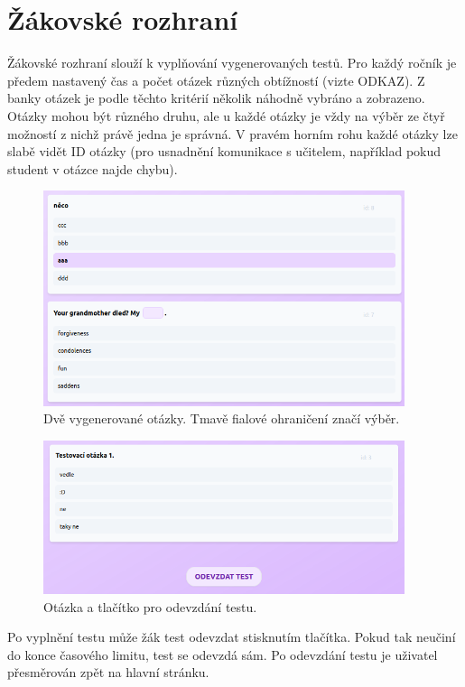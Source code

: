 \section{Žákovské rozhraní}

Žákovské rozhraní slouží k vyplňování vygenerovaných testů. Pro každý ročník je předem nastavený čas a počet otázek různých obtížností (vizte ODKAZ). Z banky otázek je podle těchto kritérií několik náhodně vybráno a zobrazeno. Otázky mohou být různého druhu, ale u každé otázky je vždy na výběr ze čtyř možností z nichž právě jedna je správná. V pravém horním rohu každé otázky lze slabě vidět ID otázky (pro usnadnění komunikace s učitelem, například pokud student v otázce najde chybu).

\begin{figure}[H]
    \centering
    \includegraphics[width=400px]{images/01design/otazky.png}
    \caption{Dvě vygenerované otázky. Tmavě fialové ohraničení značí výběr.}
\end{figure}

\begin{figure}[H]
    \centering
    \includegraphics[width=400px]{images/01design/submit.png}
    \caption{Otázka a tlačítko pro odevzdání testu.}
\end{figure}

Po vyplnění testu může žák test odevzdat stisknutím tlačítka. Pokud tak neučiní do konce časového limitu, test se odevzdá sám. Po odevzdání testu je uživatel přesměrován zpět na hlavní stránku.

